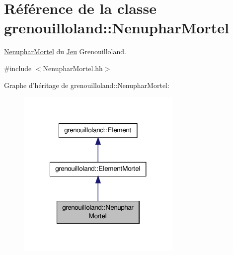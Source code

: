 \hypertarget{classgrenouilloland_1_1NenupharMortel}{\section{Référence de la classe grenouilloland\-:\-:Nenuphar\-Mortel}
\label{classgrenouilloland_1_1NenupharMortel}
}


\hyperlink{classgrenouilloland_1_1NenupharMortel}{Nenuphar\-Mortel} du \hyperlink{classgrenouilloland_1_1Jeu}{Jeu} Grenouilloland.  




{\ttfamily \#include $<$Nenuphar\-Mortel.\-hh$>$}



Graphe d'héritage de grenouilloland\-:\-:Nenuphar\-Mortel\-:
\nopagebreak
\begin{figure}[H]
\begin{center}
\leavevmode
\includegraphics[width=224pt]{classgrenouilloland_1_1NenupharMortel__inherit__graph}
\end{center}
\end{figure}


